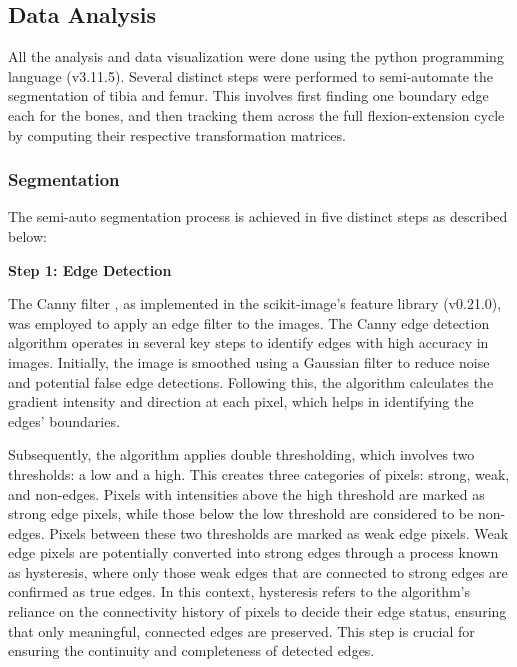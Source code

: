 \documentclass{micro-econ-thesis}
\begin{document}
\subsection{Data Analysis}
All the analysis and data visualization were done using the python programming language (v3.11.5). Several distinct steps were performed to semi-automate the segmentation of tibia and femur. This involves first finding one boundary edge each for the bones, and then tracking them across the full flexion-extension cycle by computing their respective transformation matrices. 
 
\subsubsection{Segmentation}
The semi-auto segmentation process is achieved in five distinct steps as described below: 

\textbf{Step 1: Edge Detection}

The Canny filter \parencite{canny_computational_1986}, as implemented in the scikit-image's feature library (v0.21.0), was employed to apply an edge filter to the images. The Canny edge detection algorithm operates in several key steps to identify edges with high accuracy in images. Initially, the image is smoothed using a Gaussian filter to reduce noise and potential false edge detections. Following this, the algorithm calculates the gradient intensity and direction at each pixel, which helps in identifying the edges' boundaries.

Subsequently, the algorithm applies double thresholding, which involves two thresholds: a low and a high. This creates three categories of pixels: strong, weak, and non-edges. Pixels with intensities above the high threshold are marked as strong edge pixels, while those below the low threshold are considered to be non-edges. Pixels between these two thresholds are marked as weak edge pixels. Weak edge pixels are potentially converted into strong edges through a process known as hysteresis, where only those weak edges that are connected to strong edges are confirmed as true edges. In this context, hysteresis refers to the algorithm's reliance on the connectivity history of pixels to decide their edge status, ensuring that only meaningful, connected edges are preserved. This step is crucial for ensuring the continuity and completeness of detected edges.  
\end{document}
